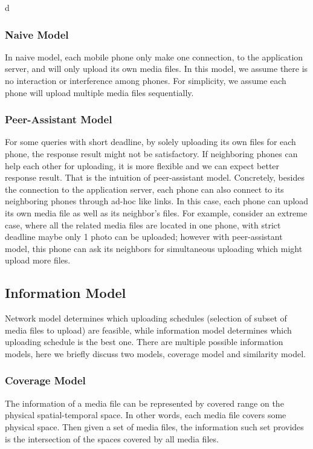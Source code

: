 d\documentclass[letterpaper]{sig-alternate-10pt}
\begin{document}
\subsubsection{Naive Model}

In naive model, each mobile phone only make one connection, to the application server, and will only upload its own media files. In this model, we assume there is no interaction or interference among phones. For simplicity, we assume each phone will upload multiple media files sequentially. 

\subsubsection{Peer-Assistant Model}

For some queries with short deadline, by solely uploading its own files for each phone, the response result might not be satisfactory. If neighboring phones can help each other for uploading, it is more flexible and we can expect better response result. That is the intuition of peer-assistant model. Concretely, besides the connection to the application server, each phone can also connect to its neighboring phones through ad-hoc like links. In this case, each phone can upload its own media file as well as its neighbor's files. For example, consider an extreme case, where all the related media files are located in one phone, with strict deadline maybe only 1 photo can be uploaded; however with peer-assistant model, this phone can ask its neighbors for simultaneous uploading which might upload more files.

\subsection{Information Model}

Network model determines which uploading schedules (selection of subset of media files to upload) are feasible, while information model determines which uploading schedule is the best one. There are multiple possible information models, here we briefly discuss two models, coverage model and similarity model.

\subsubsection{Coverage Model}

The information of a media file can be represented by covered range on the physical spatial-temporal space. In other words, each media file covers some physical space. Then given a set of media files, the information such set provides is the intersection of the spaces covered by all media files. 
\end{document}
